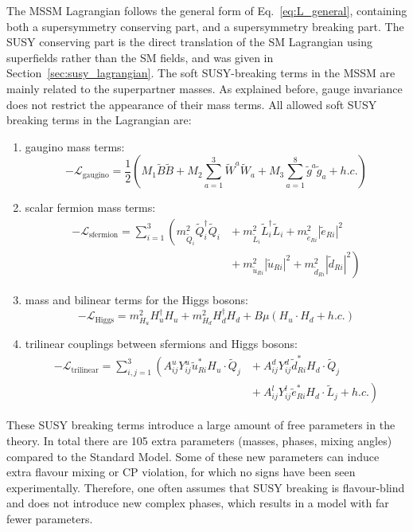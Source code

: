 The MSSM Lagrangian follows the general form of Eq.~\ref{eq:L_general}, containing both a
supersymmetry conserving part, and a supersymmetry breaking part. 
The SUSY conserving part is the direct translation of the SM Lagrangian using superfields rather
than the SM fields, and was given in Section~\ref{sec:susy_lagrangian}.  
The soft SUSY-breaking terms in the MSSM are mainly related to the superpartner masses. As
explained before, gauge invariance does not restrict the appearance of their mass terms. 
All allowed soft SUSY breaking terms in the Lagrangian are:
\begin{enumerate}
  \item gaugino mass terms: 
    \begin{equation}
      - \mathcal{L}_{\text{gaugino}} = \frac{1}{2} \left( M_1\widetilde{B}\widetilde{B} + M_2
\sum_{a=1}^3 \widetilde{W}^a\widetilde{W}_a + M_3 \sum_{a=1}^8 \widetilde{g}^a\widetilde{g}_a + h.c.
\right) \label{eq:gaugino_mass}
    \end{equation}
  \item scalar fermion mass terms:
    \begin{align}
      - \mathcal{L}_{\text{sfermion}} = \sum_{i=1}^3 \left( 
m_{\widetilde{Q}_i}^2\widetilde{Q}^\dagger_i\widetilde{Q}_i \right.
&{}+ m_{\widetilde{L}_i}^2\widetilde{L}^\dagger_i\widetilde{L}_i +
m_{\widetilde{e}_{Ri}}^2 \left|\widetilde{e}_{Ri}\right|^2  
 \nonumber \\
 &{}+ \left. m_{\widetilde{u}_{Ri}}^2\left|\widetilde{u}_{Ri}\right|^2 +
m_{\widetilde{d}_{Ri}}^2 \left|\widetilde{d}_{Ri}\right|^2
\right)
\end{align}
  \item mass and bilinear terms for the Higgs bosons:
    \begin{equation}
      - \mathcal{L}_{\text{Higgs}} = m^2_{H_u} H_u^\dagger H_u + m^2_{H_d} H_d^\dagger H_d + B\mu
(H_u \cdot H_d + h.c.)
      \label{eq:L_higgs}
    \end{equation}
  \item trilinear couplings between sfermions and Higgs bosons:
    \begin{align}
       - \mathcal{L}_{\text{trilinear}} = \sum_{i,j=1}^3 \left( A_{ij}^u Y_{ij}^u
\widetilde{u}_{Ri}^* H_u \cdot \widetilde{Q}_j \right. &{}+ A_{ij}^d Y_{ij}^d \widetilde{d}_{Ri}^*
H_d \cdot \widetilde{Q}_j \nonumber \\
&{}+ \left. A_{ij}^l Y_{ij}^l \widetilde{e}_{Ri}^* H_d \cdot \widetilde{L}_j + h.c. \right)
    \end{align}

\end{enumerate}
These SUSY breaking terms introduce a large amount of free parameters in the theory. In total there
are 105 extra parameters (masses, phases, mixing angles) compared to the Standard Model. 
Some of these new parameters can induce extra flavour mixing or CP violation, for which no signs
have been seen experimentally. Therefore, one often assumes that SUSY breaking is flavour-blind
and does not introduce new complex phases, which results in a model with far fewer parameters. 

